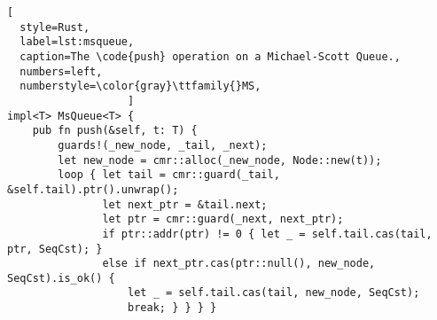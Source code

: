 \begin{lstlisting}[
  style=Rust,
  label=lst:msqueue,
  caption=The \code{push} operation on a Michael-Scott Queue.,
  numbers=left,
  numberstyle=\color{gray}\ttfamily{}MS,
                   ]
impl<T> MsQueue<T> {
    pub fn push(&self, t: T) {
        guards!(_new_node, _tail, _next);
        let new_node = cmr::alloc(_new_node, Node::new(t));
        loop { let tail = cmr::guard(_tail, &self.tail).ptr().unwrap();
               let next_ptr = &tail.next;
               let ptr = cmr::guard(_next, next_ptr);
               if ptr::addr(ptr) != 0 { let _ = self.tail.cas(tail, ptr, SeqCst); }
               else if next_ptr.cas(ptr::null(), new_node, SeqCst).is_ok() {
                   let _ = self.tail.cas(tail, new_node, SeqCst);
                   break; } } } }
\end{lstlisting}

